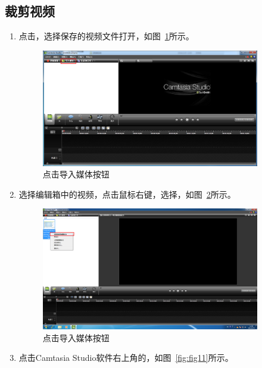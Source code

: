 \documentclass[12pt]{article}
\begin{document}
\subsection{裁剪视频}
\begin{enumerate}
\item 点击{\color{blue}{导入媒体}}，选择保存的视频文件打开，如图~\ref{fig:addFig1}所示。\par
 \begin{figure}
    \centering
    \includegraphics[width=0.9\textwidth]{addFig1.png}
    \caption{点击导入媒体按钮}
    \label{fig:addFig1}
    \end{figure}
\item 选择编辑箱中的视频，点击鼠标右键，选择{\color{blue}{添加到时间轴播放}}，如图~\ref{fig:addFig2}所示。\par
 \begin{figure}
    \centering
    \includegraphics[width=0.9\textwidth]{addFig2.png}
    \caption{点击导入媒体按钮}
    \label{fig:addFig2}
    \end{figure}
\item 点击Camtasia Studio软件右上角的{\color{blue}{裁剪按钮}}，如图~\ref{fig:fig11}所示。\par
     \begin{figure}

\end{figure}
\end{enumerate}
\end{document}
